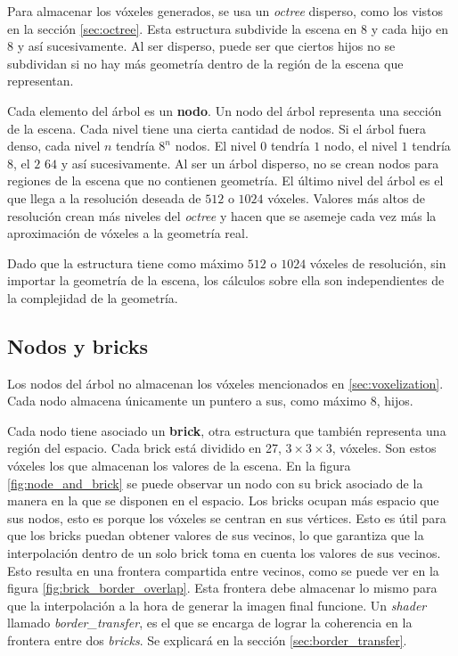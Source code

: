 Para almacenar los vóxeles generados, se usa un \textit{octree} disperso, como los vistos en la sección \ref{sec:octree}.
Esta estructura subdivide la escena en $8$ y cada hijo en $8$ y así sucesivamente.
Al ser disperso, puede ser que ciertos hijos no se subdividan si no hay más geometría dentro de la región de la escena que representan.

Cada elemento del árbol es un \textbf{nodo}.
Un nodo del árbol representa una sección de la escena.
Cada nivel tiene una cierta cantidad de nodos.
Si el árbol fuera denso, cada nivel $n$ tendría $8^n$ nodos.
El nivel $0$ tendría $1$ nodo, el nivel $1$ tendría $8$, el $2$ $64$ y así sucesivamente.
Al ser un árbol disperso, no se crean nodos para regiones de la escena que no contienen geometría.
El último nivel del árbol es el que llega a la resolución deseada de $512$ o $1024$ vóxeles.
Valores más altos de resolución crean más niveles del \textit{octree} y hacen que se asemeje cada vez más la aproximación de vóxeles a la geometría real.


Dado que la estructura tiene como máximo $512$ o $1024$ vóxeles de resolución, sin importar la geometría de la escena, los cálculos sobre ella son independientes de la complejidad de la geometría.

\subsection{Nodos y bricks}\label{sec:nodes_and_bricks}

Los nodos del árbol no almacenan los vóxeles mencionados en \ref{sec:voxelization}.
Cada nodo almacena únicamente un puntero a sus, como máximo $8$, hijos.

Cada nodo tiene asociado un \textbf{brick}, otra estructura que también representa una región del espacio.
Cada brick está dividido en 27, $3\times3\times3$, vóxeles.
Son estos vóxeles los que almacenan los valores de la escena.
En la figura \ref{fig:node_and_brick} se puede observar un nodo con su brick asociado de la manera en la que se disponen en el espacio.
Los bricks ocupan más espacio que sus nodos, esto es porque los vóxeles se centran en sus vértices.
Esto es útil para que los bricks puedan obtener valores de sus vecinos, lo que garantiza que la interpolación dentro de un solo brick toma en cuenta los valores de sus vecinos.
Esto resulta en una frontera compartida entre vecinos, como se puede ver en la figura \ref{fig:brick_border_overlap}.
Esta frontera debe almacenar lo mismo para que la interpolación a la hora de generar la imagen final funcione.
Un \textit{shader} llamado \textit{border\_transfer}, es el que se encarga de lograr la coherencia en la frontera entre dos \textit{bricks}.
Se explicará en la sección \ref{sec:border_transfer}.

